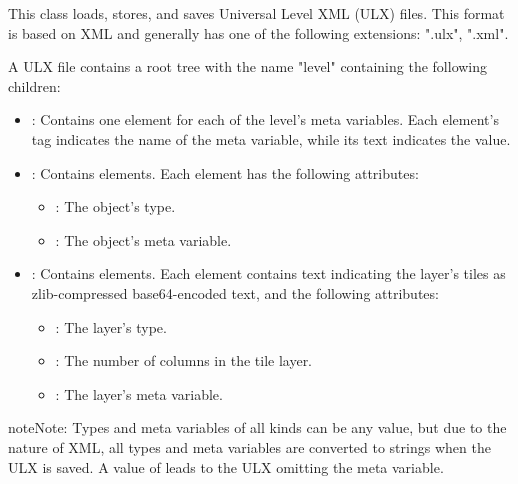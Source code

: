 \documentclass[letterpaper,10pt,english]{sphinxmanual}
\begin{document}
\begin{fulllineitems}
\label{\detokenize{index:ulvl.ULX}}
This class loads, stores, and saves Universal Level XML (ULX) files.
This format is based on XML and generally has one of the following
extensions: ".ulx", ".xml".

A ULX file contains a root tree with the name "level" containing the
following children:
\begin{itemize}
\item {} 
: Contains one element for each of the level's meta
variables.  Each element's tag indicates the name of the meta
variable, while its text indicates the value.

\item {} 
: Contains  elements.  Each 
element has the following attributes:
\begin{itemize}
\item {} 
: The object's type.

\item {} 
: The object's meta variable.

\end{itemize}

\item {} 
: Contains  elements.  Each  element
contains text indicating the layer's tiles as zlib-compressed
base64-encoded text, and the following attributes:
\begin{itemize}
\item {} 
: The layer's type.

\item {} 
: The number of columns in the tile layer.

\item {} 
: The layer's meta variable.

\end{itemize}

\end{itemize}

\begin{sphinxadmonition}{note}{Note:}
Types and meta variables of all kinds can be any value, but due
to the nature of XML, all types and meta variables are converted
to strings when the ULX is saved. A value of 
leads to the ULX omitting the meta variable.
\end{sphinxadmonition}


\end{fulllineitems}
\end{document}
